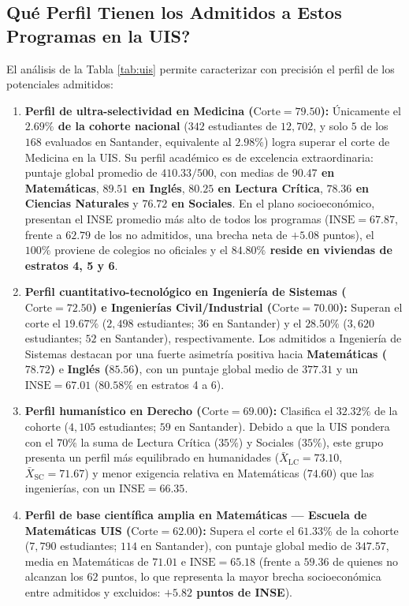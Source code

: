 \documentclass[11pt,letterpaper]{article}
\begin{document}
\subsection{\textquestiondown Qué Perfil Tienen los Admitidos a Estos Programas en la UIS?}
El análisis de la Tabla \ref{tab:uis} permite caracterizar con precisión el perfil de los potenciales admitidos:
\begin{enumerate}
    \item \textbf{Perfil de ultra-selectividad en Medicina ($\text{Corte} = 79.50$):} Únicamente el \textbf{$2.69\%$ de la cohorte nacional} ($342$ estudiantes de $12,702$, y solo $5$ de los $168$ evaluados en Santander, equivalente al $2.98\%$) logra superar el corte de Medicina en la UIS. Su perfil académico es de excelencia extraordinaria: puntaje global promedio de \textbf{$410.33 / 500$}, con medias de \textbf{$90.47$ en Matemáticas}, \textbf{$89.51$ en Inglés}, \textbf{$80.25$ en Lectura Crítica}, \textbf{$78.36$ en Ciencias Naturales} y \textbf{$76.72$ en Sociales}. En el plano socioeconómico, presentan el INSE promedio más alto de todos los programas (\textbf{$\text{INSE} = 67.87$}, frente a $62.79$ de los no admitidos, una brecha neta de $+5.08$ puntos), el $100\%$ proviene de colegios no oficiales y el \textbf{$84.80\%$ reside en viviendas de estratos 4, 5 y 6}.
    \item \textbf{Perfil cuantitativo-tecnológico en Ingeniería de Sistemas ($\text{Corte} = 72.50$) e Ingenierías Civil/Industrial ($\text{Corte} = 70.00$):} Superan el corte el \textbf{$19.67\%$} ($2,498$ estudiantes; $36$ en Santander) y el \textbf{$28.50\%$} ($3,620$ estudiantes; $52$ en Santander), respectivamente. Los admitidos a Ingeniería de Sistemas destacan por una fuerte asimetría positiva hacia \textbf{Matemáticas ($78.72$)} e \textbf{Inglés ($85.56$)}, con un puntaje global medio de $377.31$ y un \textbf{$\text{INSE} = 67.01$} ($80.58\%$ en estratos 4 a 6).
    \item \textbf{Perfil humanístico en Derecho ($\text{Corte} = 69.00$):} Clasifica el \textbf{$32.32\%$} de la cohorte ($4,105$ estudiantes; $59$ en Santander). Debido a que la UIS pondera con el $70\%$ la suma de Lectura Crítica ($35\%$) y Sociales ($35\%$), este grupo presenta un perfil más equilibrado en humanidades ($\bar{X}_{\text{LC}} = 73.10$, $\bar{X}_{\text{SC}} = 71.67$) y menor exigencia relativa en Matemáticas ($74.60$) que las ingenierías, con un \textbf{$\text{INSE} = 66.35$}.
    \item \textbf{Perfil de base científica amplia en Matemáticas — Escuela de Matemáticas UIS ($\text{Corte} = 62.00$):} Supera el corte el \textbf{$61.33\%$} de la cohorte ($7,790$ estudiantes; $114$ en Santander), con puntaje global medio de $347.57$, media en Matemáticas de $71.01$ e \textbf{$\text{INSE} = 65.18$} (frente a $59.36$ de quienes no alcanzan los $62$ puntos, lo que representa la mayor brecha socioeconómica entre admitidos y excluidos: \textbf{$+5.82$ puntos de INSE}).

\end{enumerate}
\end{document}
